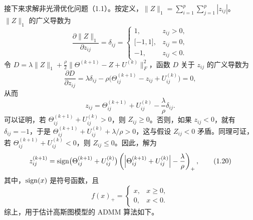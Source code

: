 接下来求解非光滑优化问题（1.1）。按定义，$\|Z\|_1=\sum_{i=1}^p\sum_{j=1}^p|z_{ij}|$。$\|Z\|_1$ 的广义导数为
\begin{equation}
\frac{\partial\|Z\|_1}{\partial z_{ij}}=\delta_{ij}=
\begin{cases}
1,&z_{ij}>0,\\
\lbrack-1,1\rbrack,&z_{ij}=0,\\
-1,&z_{ij}<0.
\end{cases}\tag{1.17}
\end{equation}
令 $D=\lambda\|Z\|_1+\frac\rho2\|\Theta^{(k+1)}-Z+U^{(k)}\|_F^2$，函数 $D$ 关于 $z_{ij}$ 的广义导数为
\begin{equation}
\frac{\partial D}{\partial z_{ij}}=\lambda\delta_{ij}
-\rho\bigl(\Theta_{ij}^{(k+1)}-z_{ij}+U_{ij}^{(k)}\bigr)=0,
\tag{1.18}
\end{equation}
从而
\begin{equation}
z_{ij}=\Theta_{ij}^{(k+1)}+U_{ij}^{(k)}-\frac\lambda\rho\delta_{ij}.
\tag{1.19}
\end{equation}
可以证明，若 $\Theta_{ij}^{(k+1)}+U_{ij}^{(k)}>0$，则 $Z_{ij}\geq0$。否则，如果 $z_{ij}<0$，就有 $\delta_{ij}=-1$，于是 $\Theta_{ij}^{(k+1)}+U_{ij}^{(k)}+\lambda/\rho>0$，这与假设 $Z_{ij}<0$ 矛盾。同理可证，若 $\Theta_{ij}^{(k+1)}+U_{ij}^{(k)}<0$，则 $Z_{ij}\leq0$。因此，解为
\begin{equation}
z_{ij}^{(k+1)}=\operatorname{sign}\bigl(\Theta_{ij}^{(k+1)}+U_{ij}^{(k)}\bigr)
\left(\left|\Theta_{ij}^{(k+1)}+U_{ij}^{(k)}\right|-\frac\lambda\rho\right)_+,
\tag{1.20}
\end{equation}
其中，$\operatorname{sign}(x)$ 是符号函数，且
\[
f(x)_+=\begin{cases}x,&x\geq0,\\0,&x<0.\end{cases}
\]
综上，用于估计高斯图模型的 ADMM 算法如下。

